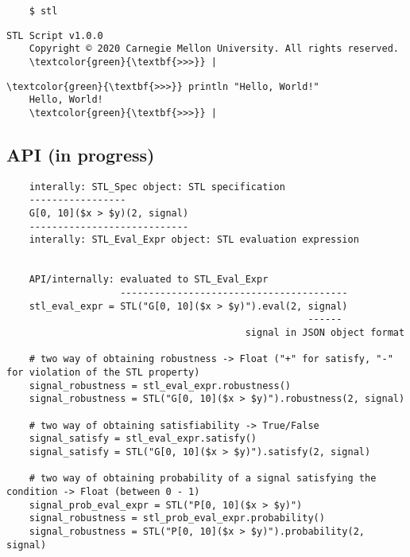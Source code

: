 \documentclass[titlepage]{article}
\begin{document}
\begin{verbatim}
    $ stl
\end{verbatim}


\begin{Verbatim}[commandchars=\\\{\}]
    STL Script v1.0.0
    Copyright © 2020 Carnegie Mellon University. All rights reserved.
    \textcolor{green}{\textbf{>>>}} |
\end{Verbatim}


\begin{Verbatim}[commandchars=\\\{\}]
    \textcolor{green}{\textbf{>>>}} println "Hello, World!"
    Hello, World!
    \textcolor{green}{\textbf{>>>}} |
\end{Verbatim}

\subsection{API (in progress)}

\begin{verbatim}
    interally: STL_Spec object: STL specification
    -----------------
    G[0, 10]($x > $y)(2, signal)
    ----------------------------
    interally: STL_Eval_Expr object: STL evaluation expression


    API/internally: evaluated to STL_Eval_Expr
                    ----------------------------------------
    stl_eval_expr = STL("G[0, 10]($x > $y)").eval(2, signal)
                                                     ------
                                          signal in JSON object format
    
    # two way of obtaining robustness -> Float ("+" for satisfy, "-" for violation of the STL property)                   
    signal_robustness = stl_eval_expr.robustness()
    signal_robustness = STL("G[0, 10]($x > $y)").robustness(2, signal)

    # two way of obtaining satisfiability -> True/False
    signal_satisfy = stl_eval_expr.satisfy()
    signal_satisfy = STL("G[0, 10]($x > $y)").satisfy(2, signal)

    # two way of obtaining probability of a signal satisfying the condition -> Float (between 0 - 1)
    signal_prob_eval_expr = STL("P[0, 10]($x > $y)")
    signal_robustness = stl_prob_eval_expr.probability()
    signal_robustness = STL("P[0, 10]($x > $y)").probability(2, signal)

\end{verbatim}
\end{document}
